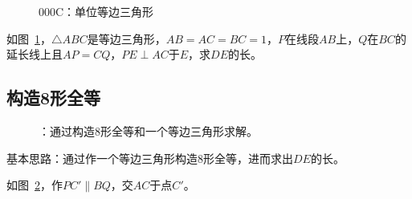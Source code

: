 

\begin{figure}[htbp]
  \centering
  \caption{000C：单位等边三角形} \label{fig:000C}
\end{figure}

如图~\ref{fig:000C}，$\triangle ABC$是等边三角形，$AB = AC = BC = 1$，$P$在线段$AB$上，$Q$在$BC$的延长线上且$AP = CQ$，$PE \perp AC$于$E$，求$DE$的长。


\subsection{构造8形全等} \label{subsec:000C-8eq}

\begin{figure}[htbp]
  \centering
  \caption{：通过构造8形全等和一个等边三角形求解。}
  \label{fig:000C-8eq}
\end{figure}

基本思路：通过作一个等边三角形构造8形全等，进而求出$DE$的长。

如图~\ref{fig:000C-8eq}，作$PC' \parallel BQ$，交$AC$于点$C'$。

